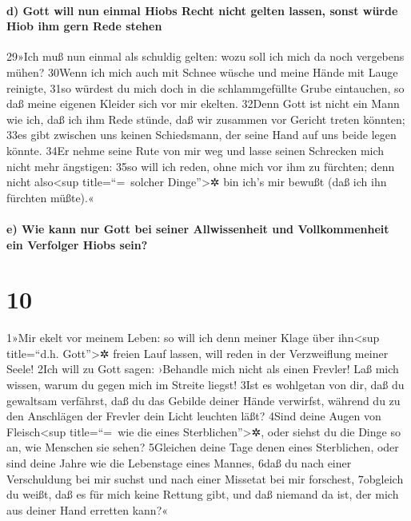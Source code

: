 \hypertarget{d-gott-will-nun-einmal-hiobs-recht-nicht-gelten-lassen-sonst-wuxfcrde-hiob-ihm-gern-rede-stehen}{%
\paragraph{d) Gott will nun einmal Hiobs Recht nicht gelten lassen,
sonst würde Hiob ihm gern Rede
stehen}\label{d-gott-will-nun-einmal-hiobs-recht-nicht-gelten-lassen-sonst-wuxfcrde-hiob-ihm-gern-rede-stehen}}

29»Ich muß nun einmal als schuldig gelten: wozu soll ich mich da noch
vergebens mühen? 30Wenn ich mich auch mit Schnee wüsche und meine Hände
mit Lauge reinigte, 31so würdest du mich doch in die schlammgefüllte
Grube eintauchen, so daß meine eigenen Kleider sich vor mir ekelten.
32Denn Gott ist nicht ein Mann wie ich, daß ich ihm Rede stünde, daß wir
zusammen vor Gericht treten könnten; 33es gibt zwischen uns keinen
Schiedsmann, der seine Hand auf uns beide legen könnte. 34Er nehme seine
Rute von mir weg und lasse seinen Schrecken mich nicht mehr ängstigen:
35so will ich reden, ohne mich vor ihm zu fürchten; denn nicht
also\textless sup title=``=~solcher Dinge''\textgreater✲ bin ich's mir
bewußt (daß ich ihn fürchten müßte).«

\hypertarget{e-wie-kann-nur-gott-bei-seiner-allwissenheit-und-vollkommenheit-ein-verfolger-hiobs-sein}{%
\paragraph{e) Wie kann nur Gott bei seiner Allwissenheit und
Vollkommenheit ein Verfolger Hiobs
sein?}\label{e-wie-kann-nur-gott-bei-seiner-allwissenheit-und-vollkommenheit-ein-verfolger-hiobs-sein}}

\hypertarget{section-9}{%
\section{10}\label{section-9}}

1»Mir ekelt vor meinem Leben: so will ich denn meiner Klage über
ihn\textless sup title=``d.h. Gott''\textgreater✲ freien Lauf lassen,
will reden in der Verzweiflung meiner Seele! 2Ich will zu Gott sagen:
›Behandle mich nicht als einen Frevler! Laß mich wissen, warum du gegen
mich im Streite liegst! 3Ist es wohlgetan von dir, daß du gewaltsam
verfährst, daß du das Gebilde deiner Hände verwirfst, während du zu den
Anschlägen der Frevler dein Licht leuchten läßt? 4Sind deine Augen von
Fleisch\textless sup title=``=~wie die eines Sterblichen''\textgreater✲,
oder siehst du die Dinge so an, wie Menschen sie sehen? 5Gleichen deine
Tage denen eines Sterblichen, oder sind deine Jahre wie die Lebenstage
eines Mannes, 6daß du nach einer Verschuldung bei mir suchst und nach
einer Missetat bei mir forschest, 7obgleich du weißt, daß es für mich
keine Rettung gibt, und daß niemand da ist, der mich aus deiner Hand
erretten kann?«

